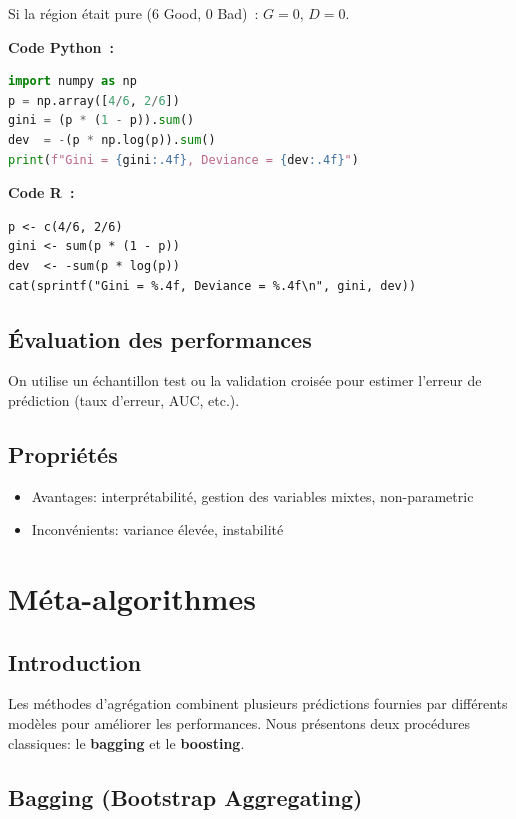 \documentclass[a4paper,12pt]{article}
\begin{document}
Si la région était pure (6 Good, 0 Bad)~: $G = 0$, $D = 0$.

\newpage
\noindent\textbf{Code Python~:}
\begin{lstlisting}[language=Python]
import numpy as np
p = np.array([4/6, 2/6])
gini = (p * (1 - p)).sum()
dev  = -(p * np.log(p)).sum()
print(f"Gini = {gini:.4f}, Deviance = {dev:.4f}")
\end{lstlisting}

\noindent\textbf{Code R~:}
\begin{lstlisting}[]
p <- c(4/6, 2/6)
gini <- sum(p * (1 - p))
dev  <- -sum(p * log(p))
cat(sprintf("Gini = %.4f, Deviance = %.4f\n", gini, dev))
\end{lstlisting}
\newpage

\subsection{Évaluation des performances}
On utilise un échantillon test ou la validation croisée pour estimer l'erreur de prédiction (taux d'erreur, AUC, etc.).

\subsection{Propriétés}
\begin{itemize}
  \item Avantages: interprétabilité, gestion des variables mixtes, non-parametric
  \item Inconvénients: variance élevée, instabilité
\end{itemize}

\section{Méta-algorithmes}

\subsection{Introduction}
Les méthodes d'agrégation combinent plusieurs prédictions fournies par différents modèles pour améliorer les performances. Nous présentons deux procédures classiques: le \textbf{bagging} et le \textbf{boosting}.

\subsection{Bagging (Bootstrap Aggregating)}
\end{document}
